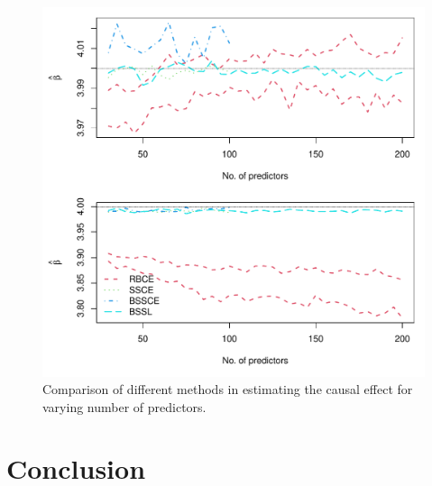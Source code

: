 \documentclass[preprint,12pt]{elsarticle}
\begin{document}
\begin{figure}
    \centering
    \includegraphics[width = 0.9\linewidth]{treat_pred.pdf}
    \caption{Comparison of different methods in estimating the causal effect for varying number of predictors.}
    \label{fig:comp:trt:pred}
\end{figure}



\section{Conclusion}\label{sec:conc}
\end{document}
